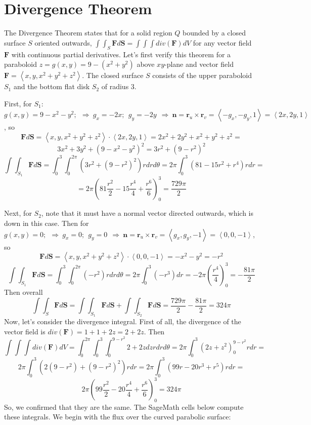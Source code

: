 \section{Divergence Theorem}

The Divergence Theorem states that for a solid region $Q$ bounded by a closed surface $S$ oriented outwards, $\int\int_S \mathbf{F}d\mathbf{S} = \int\int\int div( \mathbf{F})dV$ for any vector field $ \mathbf{F}$ with continuous partial derivatives.   Let's first verify this theorem for a paraboloid $z=g(x,y)=9-(x^2+y^2)$ above $xy$-plane and vector field $\mathbf{F} = \left< x,y,x^2+y^2+z^2 \right>$.    The closed surface $S$ consists of the upper paraboloid $S_1$ and the bottom flat disk $S_2$ of radius $3$.

First, for $S_1$: $g(x,y) = 9-x^2-y^2; \  \ \Rightarrow \ g_x = -2x; \ \ g_y=-2y \  \ \Rightarrow \ \mathbf{n} = \mathbf{r}_u \times \mathbf{r}_v = \left<  -g_x, -g_y,1 \right>= \left<  2x, 2y,1 \right>$, so
$$\mathbf{F}d\mathbf{S} = \left<  x, y, x^2+y^2+z^2 \right> \cdot \left<  2x, 2y,1 \right>= 2x^2+2y^2+x^2+y^2+z^2=$$
$$ 3x^2+3y^2+(9-x^2-y^2)^2=3r^2+(9-r^2)^2$$
 $$\int\int_{S_1}\mathbf{F}d\mathbf{S} = \int_0^3 \int_0^{2\pi} (3r^2+(9-r^2)^2)r dr d\theta = 2\pi  \int_0^3 (81 -15r^2 + r^4)r dr  = $$
 $$ =  2\pi \left( 81 \frac{r^2}{2} -15 \frac{r^4}{4} + \frac{r^6}{6} \right)_0^3 = \frac{729 \pi}{2}$$

Next, for $S_2$, note that it must have a normal vector directed outwards, which is down in this case. Then for $g(x,y) =0; \  \ \Rightarrow \ g_x = 0; \ \ g_y=0 \  \ \Rightarrow \ \mathbf{n} = \mathbf{r}_u \times \mathbf{r}_v = \left<  g_x,g_y,-1 \right>= \left<  0, 0, -1 \right>$, so
$$\mathbf{F}d\mathbf{S} = \left<  x, y, x^2+y^2+z^2 \right> \cdot \left<  0, 0,-1 \right>= -x^2-y^2=-r^2$$
$$\int\int_{S_1}\mathbf{F}d\mathbf{S} = \int_0^3 \int_0^{2\pi} (-r^2)r dr d\theta = 2\pi  \int_0^3 (-r^3) dr  =  -2\pi \left( \frac{r^4}{4}\right)_0^3 = - \frac{81 \pi}{2}$$
Then overall 
$$\int\int_{S}\mathbf{F}d\mathbf{S} = \int\int_{S_1}\mathbf{F}d\mathbf{S}+\int\int_{S_2}\mathbf{F}d\mathbf{S}=\frac{729 \pi}{2} - \frac{81 \pi}{2} = 324\pi$$
Now, let's consider the divergence integral.   First of all, the divergence of the vector field is $div(\mathbf{F}) = 1+1+2z=2+2z$.  Then
$$ \int\int\int div(\mathbf{F}) dV = \int_0^{2\pi}\int_0^3 \int_0^{9-r^2} 2+2z dz r dr d\theta = 2\pi \int_0^3 \left(2z + z^2 \right)_0^{9-r^2} rdr =$$
$$  2\pi \int_0^3 \left(2(9-r^2) + (9-r^2)^2 \right) rdr =  2\pi \int_0^3 \left(  99r -20r^3 + r^5 \right) rdr =$$
$$ 2\pi \left( 99\frac{r^2}{2} - 20\frac{r^4}{4}+\frac{r^6}{6} \right)_0^3 =324 \pi $$So, we confirmed that they are the same.   The SageMath cells below compute these integrals.  We begin with the flux over the curved parabolic surface:

